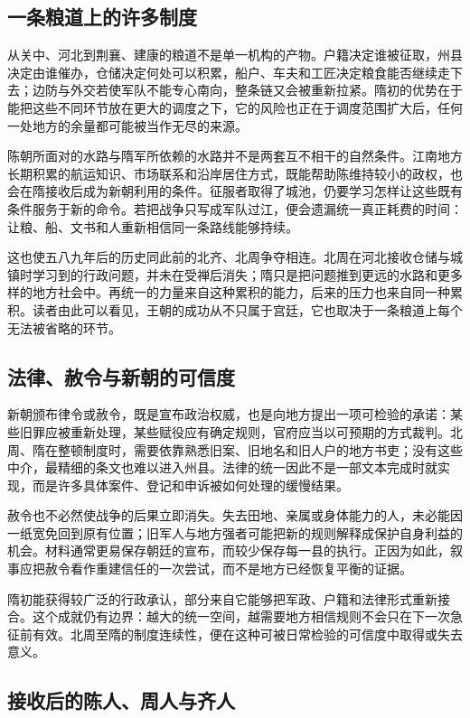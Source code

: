 \subsection{一条粮道上的许多制度}

从关中、河北到荆襄、建康的粮道不是单一机构的产物。户籍决定谁被征取，州县决定由谁催办，仓储决定何处可以积累，船户、车夫和工匠决定粮食能否继续走下去；边防与外交若使军队不能专心南向，整条链又会被重新拉紧。隋初的优势在于能把这些不同环节放在更大的调度之下，它的风险也正在于调度范围扩大后，任何一处地方的余量都可能被当作无尽的来源。

陈朝所面对的水路与隋军所依赖的水路并不是两套互不相干的自然条件。江南地方长期积累的航运知识、市场联系和沿岸居住方式，既能帮助陈维持较小的政权，也会在隋接收后成为新朝利用的条件。征服者取得了城池，仍要学习怎样让这些既有条件服务于新的命令。若把战争只写成军队过江，便会遗漏统一真正耗费的时间：让粮、船、文书和人重新相信同一条路线能够持续。

这也使五八九年后的历史同此前的北齐、北周争夺相连。北周在河北接收仓储与城镇时学习到的行政问题，并未在受禅后消失；隋只是把问题推到更远的水路和更多样的地方社会中。再统一的力量来自这种累积的能力，后来的压力也来自同一种累积。读者由此可以看见，王朝的成功从不只属于宫廷，它也取决于一条粮道上每个无法被省略的环节。

\subsection{法律、赦令与新朝的可信度}

新朝颁布律令或赦令，既是宣布政治权威，也是向地方提出一项可检验的承诺：某些旧罪应被重新处理，某些赋役应有确定规则，官府应当以可预期的方式裁判。北周、隋在整顿制度时，需要依靠熟悉旧案、旧地名和旧人户的地方书吏；没有这些中介，最精细的条文也难以进入州县。法律的统一因此不是一部文本完成时就实现，而是许多具体案件、登记和申诉被如何处理的缓慢结果。

赦令也不必然使战争的后果立即消失。失去田地、亲属或身体能力的人，未必能因一纸宽免回到原有位置；旧军人与地方强者可能把新的规则解释成保护自身利益的机会。材料通常更易保存朝廷的宣布，而较少保存每一县的执行。正因为如此，叙事应把赦令看作重建信任的一次尝试，而不是地方已经恢复平衡的证据。

隋初能获得较广泛的行政承认，部分来自它能够把军政、户籍和法律形式重新接合。这个成就仍有边界：越大的统一空间，越需要地方相信规则不会只在下一次急征前有效。北周至隋的制度连续性，便在这种可被日常检验的可信度中取得或失去意义。

\subsection{接收后的陈人、周人与齐人}

